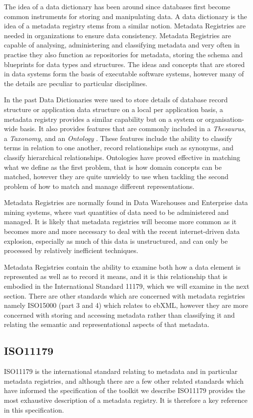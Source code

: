 The idea of a data dictionary has been around since databases first become common instruments for storing and manipulating data. A data dictionary is  the idea of a metadata registry stems from a similar notion.
Metadata Registries are needed in organizations to ensure data consistency. Metadata Registries are capable of analysing, administering and classifying metadata and very often in practise they also function as repositories for metadata, storing the schema and blueprints for data types and structures. The ideas and concepts that are stored in data systems form the basis of executable software systems, however many of the details are peculiar to particular disciplines.  

In the past Data Dictionaries were used to store details of database record structure or application data structure on a local per application basis, a metadata registry provides a similar capability but on a system or organisation-wide basis. It also provides features that are commonly included in a \emph{Thesaurus}, a \emph{Taxonomy}, and an \emph{Ontology} . These features include the ability to classify terms in relation to one another, record relationships such as synonyms, and classify hierarchical relationships. Ontologies have proved effective in matching what we define as the first problem, that is how domain concepts can be matched, however they are quite unwieldy to use when tackling the second problem of how to match and manage different representations.

Metadata Registries are normally found in Data Warehouses and Enterprise data mining systems, where vast quantities of data need to be administered and managed. It is likely that metadata registries will become more common as it becomes more and more necessary to deal with the recent internet-driven data explosion, especially as much of this data is unstructured, and can only be processed by relatively inefficient techniques.

Metadata Registries contain the ability to examine both how a data element is represented as well as to record it means, and it is this relationship that is embodied in the International Standard 11179, which we will examine in the next section. There are other standards which are concerned with metadata registries namely ISO15000 (part 3 and 4)  which relates to ebXML, however they are more concerned with storing and accessing metadata rather than classifying it and relating the semantic and representational aspects of that metadata.

\subsection{ISO11179}
ISO11179 is the international standard relating to metadata and in particular metadata registries, and although there are a few other related standards which have informed the specification of the toolkit we describe ISO11179 provides the most exhaustive description of a metadata registry. It is therefore a key reference in this specification.




